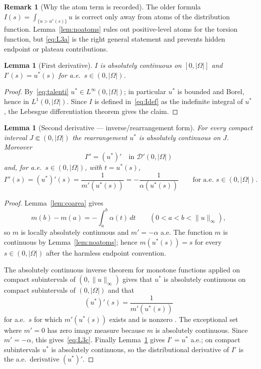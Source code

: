 \documentclass[11pt]{article}
\newtheorem{lemma}[theorem]{Lemma}
\theoremstyle{definition}
\newtheorem{remark}[theorem]{Remark}
\newcommand{\Om}{\Omega}
\begin{document}
\begin{remark}[Why the atom term is recorded]\label{rem:atom-aware}
The older formula $I(s)=\int_{\{u>u^*(s)\}}u$ is correct only away from
atoms of the distribution function.  Lemma~\ref{lem:noatoms} rules out
positive-level atoms for the torsion function, but \eqref{eq:L3a} is the
right general statement and prevents hidden endpoint or plateau
contributions.
\end{remark}

\begin{lemma}[First derivative]\label{lem:I3b}
$I$ is absolutely continuous on $[0,|\Om|]$ and $I'(s)=u^{*}(s)$ for
a.e.\ $s\in(0,|\Om|)$.
\end{lemma}

\begin{proof}
By~\eqref{eq:talenti} $u^{*}\in L^{\infty}(0,|\Om|)$; in particular
$u^{*}$ is bounded and Borel, hence in $L^{1}(0,|\Om|)$.  Since
$I$ is defined in~\eqref{eq:Idef} as the indefinite integral of $u^{*}$,
the Lebesgue differentiation theorem gives the claim.
\end{proof}

\begin{lemma}[Second derivative --- inverse/rearrangement form]\label{lem:I3c}
For every compact interval $J\Subset(0,|\Om|)$ the rearrangement $u^{*}$
is absolutely continuous on $J$.  Moreover
\[
   I''=(u^{*})'\quad\text{in }\mathcal D'(0,|\Om|)
\]
and, for a.e.\ $s\in(0,|\Om|)$, with $t=u^{*}(s)$,
\begin{equation}\label{eq:L3c}
   I''(s)=(u^{*})'(s)
   =\frac{1}{m'(u^{*}(s))}
   =-\frac{1}{\alpha(u^{*}(s))}
   \qquad\text{for a.e.\ }s\in(0,|\Om|).
\end{equation}
\end{lemma}

\begin{proof}
Lemma~\ref{lem:coarea} gives
\[
   m(b)-m(a)=-\int_a^b\alpha(t)\,dt
   \qquad(0<a<b<\|u\|_\infty),
\]
so $m$ is locally absolutely continuous and $m'=-\alpha$ a.e.  The
function $m$ is continuous by Lemma~\ref{lem:noatoms}; hence
$m(u^{*}(s))=s$ for every $s\in(0,|\Om|)$ after the harmless endpoint
convention.

The absolutely continuous inverse theorem for monotone functions applied
on compact subintervals of $(0,\|u\|_\infty)$ gives that $u^{*}$ is
absolutely continuous on compact subintervals of $(0,|\Om|)$ and that
\[
   (u^*)'(s)=\frac{1}{m'(u^*(s))}
\]
for a.e.\ $s$ for which $m'(u^*(s))$ exists and is nonzero
\cite[Thm.~0.4 and \S1]{BBC1975}.  The exceptional set where
$m'=0$ has zero image measure because $m$ is absolutely continuous.
Since $m'=-\alpha$, this gives~\eqref{eq:L3c}.  Finally
Lemma~\ref{lem:I3b} gives $I'=u^*$ a.e.; on compact subintervals
$u^*$ is absolutely continuous, so the distributional derivative of
$I'$ is the a.e.\ derivative $(u^*)'$.
\end{proof}
\end{document}
